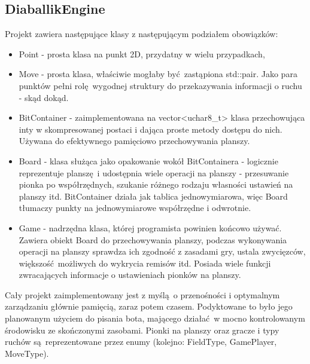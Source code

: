 \documentclass[a4paper,12pt]{article}
\begin{document}
\subsection*{DiaballikEngine}
Projekt zawiera następujące klasy z następującym podziałem obowiązków:
\begin{itemize}
 \item Point - prosta klasa na punkt 2D, przydatny w wielu przypadkach,
 \item Move - prosta klasa, właściwie mogłaby być zastąpiona std::pair. Jako para punktów pełni rolę wygodnej struktury do przekazywania informacji
 o ruchu - skąd dokąd.
 \item BitContainer - zaimplementowana na vector<uchar8_t> klasa przechowująca inty w skompresowanej postaci i dająca proste metody dostępu do nich.
 Używana do efektywnego pamięciowo przechowywania planszy.
 \item Board - klasa służąca jako opakowanie wokół BitContainera - logicznie reprezentuje planszę i udostępnia wiele operacji na planszy - 
 przesuwanie pionka po współrzędnych, szukanie różnego rodzaju własności ustawień na planszy itd. BitContainer działa jak tablica jednowymiarowa, więc
 Board tłumaczy punkty na jednowymiarowe współrzędne i odwrotnie.
 \item Game - nadrzędna klasa, której programista powinien końcowo używać. Zawiera obiekt Board do przechowywania planszy, podczas wykonywania
 operacji na planszy sprawdza ich zgodność z zasadami gry, ustala zwycięzców, większość możliwych do wykrycia remisów itd. Posiada wiele funkcji
 zwracających informacje o ustawieniach pionków na planszy.
\end{itemize}
Cały projekt zaimplementowany jest z myślą o przenośności i optymalnym zarządzaniu głównie pamięcią, zaraz potem czasem. Podyktowane to było jego
planowanym użyciem do pisania bota, mającego działać w mocno kontrolowanym środowisku ze skończonymi zasobami.
Pionki na planszy oraz gracze i typy ruchów są reprezentowane przez enumy (kolejno: FieldType, GamePlayer, MoveType).
\end{document}

